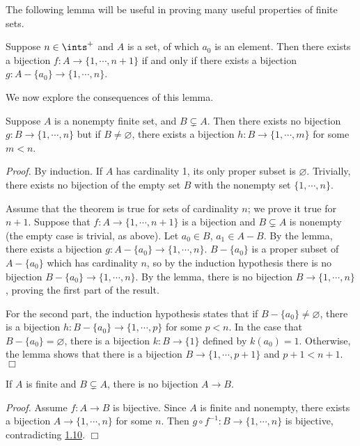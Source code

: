 The following lemma will be useful in proving many useful properties of finite sets.
\begin{lemma}\label{1.9}
    Suppose $n \in \ints^+$ and $A$ is a set, of which $a_0$ is an element. Then there exists a bijection $f: A \rightarrow \{1, \cdots, n+1\}$ if and only if there exists a bijection $g: A - \{a_0\} \rightarrow \{1, \cdots, n\}$.
\end{lemma}
We now explore the consequences of this lemma.
\begin{theorem}\label{1.10}
    Suppose $A$ is a nonempty finite set, and $B \subsetneq A$. Then there exists no bijection $g: B \rightarrow \{1, \cdots, n\}$ but if $B \neq \varnothing$, there exists a bijection $h: B \rightarrow \{1, \cdots, m\}$ for some $m< n$.
\end{theorem}

{\it Proof.} By induction. If $A$ has cardinality 1, its only proper subset is $\varnothing$. Trivially, there exists no bijection of the empty set $B$ with the nonempty set $\{1, \cdots, n\}$.

Assume that the theorem is true for sets of cardinality $n$; we prove it true for $n+1$. Suppose that $f: A \rightarrow \{1, \cdots, n+1\}$ is a bijection and $B \subsetneq A$ is nonempty (the empty case is trivial, as above). Let $a_0 \in B$, $a_1 \in A - B$. By the lemma, there exists a bijection $g: A- \{a_0\} \rightarrow \{1, \cdots, n\}$. $B-\{a_0\}$ is a proper subset of $A - \{a_0\}$ which has cardinality $n$, so by the induction hypothesis there is no bijection $B-\{a_0\} \rightarrow \{1, \cdots, n\}$. By the lemma, there is no bijection $B \rightarrow \{1, \cdots, n\}$, proving the first part of the result.

For the second part, the induction hypothesis states that if $B-\{a_0 \} \neq \varnothing$, there is a bijection $h: B - \{a_0\} \rightarrow \{1, \cdots, p\}$ for some $p < n$. In the case that $B - \{a_0\} = \varnothing$, there is a bijection $k: B \rightarrow \{1\}$ defined by $k(a_0) = 1$. Otherwise, the lemma shows that there is a bijection $B \rightarrow \{1, \cdots, p+1\}$ and $p+1 < n+1$. $\Box$

\begin{corollary}\label{1.11}
    If $A$ is finite and $B \subsetneq A$, there is no bijection $A \rightarrow B$.
\end{corollary}

{\it Proof.} Assume $f: A \rightarrow B$ is bijective. Since $A$ is finite and nonempty, there exists a bijection $A \rightarrow \{1, \cdots, n\}$ for some $n$. Then $g \circ f^{-1}: B \rightarrow \{1, \cdots, n\}$ is bijective, contradicting \hyperref[1.10]{1.10}. $\Box$

